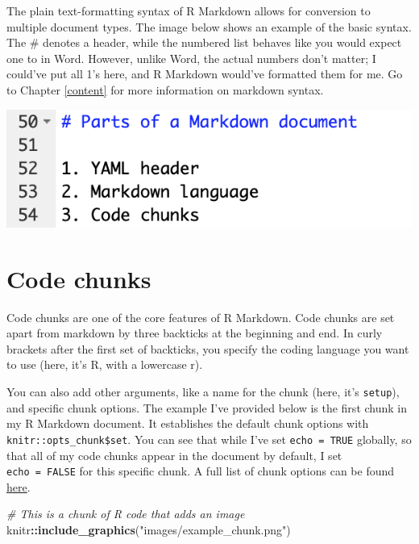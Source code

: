 \documentclass[
]{book}
\newenvironment{Shaded}{\begin{snugshade}}{\end{snugshade}}
\newcommand{\CommentTok}[1]{\textcolor[rgb]{0.56,0.35,0.01}{\textit{#1}}}
\newcommand{\KeywordTok}[1]{\textcolor[rgb]{0.13,0.29,0.53}{\textbf{#1}}}
\newcommand{\NormalTok}[1]{#1}
\newcommand{\OperatorTok}[1]{\textcolor[rgb]{0.81,0.36,0.00}{\textbf{#1}}}
\newcommand{\StringTok}[1]{\textcolor[rgb]{0.31,0.60,0.02}{#1}}
\begin{document}
The plain text-formatting syntax of R Markdown allows for conversion to multiple document types. The image below shows an example of the basic syntax. The \# denotes a header, while the numbered list behaves like you would expect one to in Word. However, unlike Word, the actual numbers don't matter; I could've put all 1's here, and R Markdown would've formatted them for me. Go to Chapter \ref{content} for more information on markdown syntax.

\includegraphics[width=8.22in]{images/example_markdown}

\hypertarget{chunkex}{%
\section{Code chunks}\label{chunkex}}

Code chunks are one of the core features of R Markdown. Code chunks are set apart from markdown by three backticks at the beginning and end. In curly brackets after the first set of backticks, you specify the coding language you want to use (here, it's R, with a lowercase r).

You can also add other arguments, like a name for the chunk (here, it's \texttt{setup}), and specific chunk options. The example I've provided below is the first chunk in my R Markdown document. It establishes the default chunk options with \texttt{knitr::opts\_chunk\$set}. You can see that while I've set \texttt{echo\ =\ TRUE} globally, so that all of my code chunks appear in the document by default, I set \texttt{echo\ =\ FALSE} for this specific chunk. A full list of chunk options can be found \href{https://rstudio.com/wp-content/uploads/2015/03/rmarkdown-reference.pdf}{here}.

\begin{Shaded}
\begin{Highlighting}[]
\CommentTok{# This is a chunk of R code that adds an image}
\NormalTok{knitr}\OperatorTok{::}\KeywordTok{include_graphics}\NormalTok{(}\StringTok{"images/example_chunk.png"}\NormalTok{)}
\end{Highlighting}
\end{Shaded}
\end{document}
